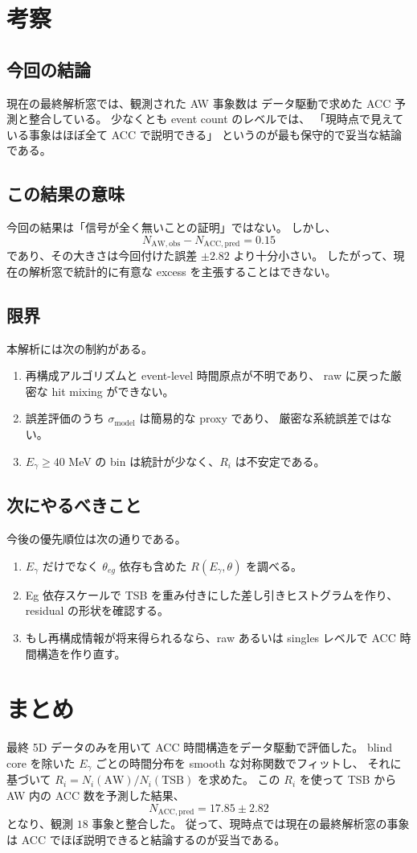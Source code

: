 \documentclass[a4paper,11pt]{jsarticle}
\begin{document}
\section{考察}
\subsection{今回の結論}
現在の最終解析窓では、観測された AW 事象数は
データ駆動で求めた ACC 予測と整合している。
少なくとも event count のレベルでは、
「現時点で見えている事象はほぼ全て ACC で説明できる」
というのが最も保守的で妥当な結論である。

\subsection{この結果の意味}
今回の結果は「信号が全く無いことの証明」ではない。
しかし、
\[
N_{\mathrm{AW,obs}} - N_{\mathrm{ACC,pred}}
= 0.15
\]
であり、その大きさは今回付けた誤差 \(\pm 2.82\) より十分小さい。
したがって、現在の解析窓で統計的に有意な excess を主張することはできない。

\subsection{限界}
本解析には次の制約がある。
\begin{enumerate}
  \item 再構成アルゴリズムと event-level 時間原点が不明であり、
  raw に戻った厳密な hit mixing ができない。
  \item 誤差評価のうち \(\sigma_{\mathrm{model}}\) は簡易的な proxy であり、
  厳密な系統誤差ではない。
  \item \(E_\gamma \ge 40\) MeV の bin は統計が少なく、\(R_i\) は不安定である。
\end{enumerate}

\subsection{次にやるべきこと}
今後の優先順位は次の通りである。
\begin{enumerate}
  \item \(E_\gamma\) だけでなく \(\theta_{eg}\) 依存も含めた
  \(R(E_\gamma,\theta)\) を調べる。
  \item Eg 依存スケールで TSB を重み付きにした差し引きヒストグラムを作り、
  residual の形状を確認する。
  \item もし再構成情報が将来得られるなら、raw あるいは singles レベルで
  ACC 時間構造を作り直す。
\end{enumerate}

\section{まとめ}
最終 5D データのみを用いて ACC 時間構造をデータ駆動で評価した。
blind core を除いた \(E_\gamma\) ごとの時間分布を smooth な対称関数でフィットし、
それに基づいて \(R_i = N_i(\mathrm{AW})/N_i(\mathrm{TSB})\) を求めた。
この \(R_i\) を使って TSB から AW 内の ACC 数を予測した結果、
\[
N_{\mathrm{ACC,pred}} = 17.85 \pm 2.82
\]
となり、観測 \(18\) 事象と整合した。
従って、現時点では現在の最終解析窓の事象は
ACC でほぼ説明できると結論するのが妥当である。
\end{document}
